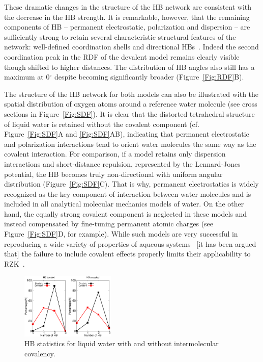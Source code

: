 \documentclass[aps,prl,reprint,amsmath,amssymb]{revtex4-1}
\begin{document}
These dramatic changes in the structure of the HB network are consistent with the decrease in the HB strength. 
It is remarkable, however, that the remaining components of HB -- permanent electrostatic, polarization and dispersion -- are sufficiently strong to retain several characteristic structural features of the network: well-defined coordination shells and directional HBs~\cite{arunan2011definition}.
Indeed the second coordination peak in the RDF of the devalent model remains clearly visible though shifted to higher distances. 
The distribution of HB angles also still has a maximum at 0$^\circ$ despite becoming significantly broader (Figure~\ref{Fig:RDF}B).

The structure of the HB network for both models can also be illustrated with the spatial distribution of oxygen atoms around a reference water molecule (see cross sections in Figure~\ref{Fig:SDF}). 
It is clear that the distorted tetrahedral structure of liquid water is retained without the covalent component (cf. Figure~\ref{Fig:SDF}A and \ref{Fig:SDF}AB), indicating that permanent electrostatic and polarization interactions tend to orient water molecules the same way as the covalent interaction. 
For comparison, if a model retains only dispersion interactions and short-distance repulsion, represented by the Lennard-Jones potential, the HB becomes truly non-directional with uniform angular distribution (Figure~\ref{Fig:SDF}C). 
That is why, permanent electrostatics is widely recognized as the key component of interaction between water molecules and is included in all analytical molecular mechanics models of water. 
On the other hand, the equally strong covalent component is neglected in these models and instead compensated by fine-tuning permanent atomic charges (see Figure~\ref{Fig:SDF}D, for example). 
While such models are very successful in reproducing a wide variety of properties of aqueous systems~\cite{vega2011simulating} [it has been argued that] the failure to include covalent effects properly limits their applicability to RZK~\cite{RZK0}. %

\begin{figure}
\includegraphics[width=0.4\textwidth]{new_hbstat}
\caption{HB statistics for liquid water with and without intermolecular covalency.}\label{fig:HBstat}
\end{figure}
\end{document}
